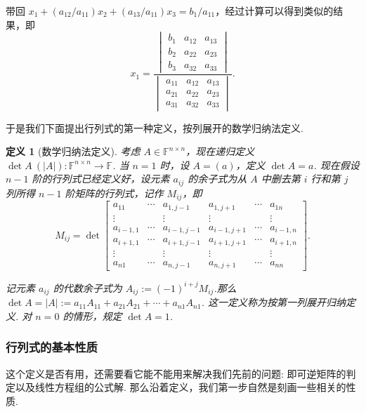 \documentclass[10pt,openany]{article}
\theoremstyle{thmstyle} %
\theoremstyle{defstyle} %
\newtheorem{definition}[theorem]{定义}
\theoremstyle{prostyle} %
\theoremstyle{exastyle}
\theoremstyle{remstyle}
\newcommand{\F}{\mathbb{F}}
\newcommand{\n}{^{n \times n}}
\begin{document}
带回 \( x_1+(a_{12}/a_{11})x_2+(a_{13}/a_{11}) x_3=b_1/a_{11} \)，经过计算可以得到类似的结果，即
\[ x_1=\frac{\begin{vmatrix}
		b_{1} & a_{12} & a_{13} \\
		b_{2} & a_{22} & a_{23} \\
		b_{3} & a_{32} & a_{33} 
\end{vmatrix}}{\begin{vmatrix}
		a_{11} & a_{12} & a_{13} \\
		a_{21} & a_{22} & a_{23} \\
		a_{31} & a_{32} & a_{33} 
\end{vmatrix}}. \]

于是我们下面提出行列式的第一种定义，按列展开的数学归纳法定义.

\begin{definition}[数学归纳法定义]\label{2.2.1}
	考虑 \( A \in \F\n \)，现在递归定义 \( \det A \ (|A|): \F\n \to \F \). 当 \( n=1 \) 时，设 \( A=(a) \)，定义 \( \det A=a \). 现在假设 \( n-1 \) 阶的行列式已经定义好，设元素 \( a_{ij} \) 的余子式为从 \( A \) 中删去第 \( i \) 行和第 \( j \) 列所得 \( n-1 \) 阶矩阵的行列式，记作 \( M_{ij} \)，即
	\[ M_{ij}=\det \begin{bmatrix}
		a_{11} & \cdots & a_{1,j-1} & a_{1,j+1} & \cdots & a_{1n} \\
		\vdots &        & \vdots   & \vdots   &        & \vdots \\
		a_{i-1,1} & \cdots & a_{i-1,j-1} & a_{i-1,j+1} & \cdots & a_{i-1,n} \\
		a_{i+1,1} & \cdots & a_{i+1,j-1} & a_{i+1,j+1} & \cdots & a_{i+1,n} \\
		\vdots &        & \vdots   & \vdots   &        & \vdots \\
		a_{n1} & \cdots & a_{n,j-1} & a_{n,j+1} & \cdots & a_{nn}
	\end{bmatrix}. \]
	
	记元素 \( a_{ij} \) 的代数余子式为 \( A_{ij}:=(-1)^{i+j}M_{ij} \).那么 \( \det A=|A|:= a_{11}A_{11}+a_{21}A_{21}+\cdots+a_{n1}A_{n1} \). 这一定义称为按第一列展开归纳定义. 对 \( n=0 \) 的情形，规定 \( \det A=1 \).
	
\end{definition}

\subsubsection{行列式的基本性质}

这个定义是否有用，还需要看它能不能用来解决我们先前的问题: 即可逆矩阵的判定以及线性方程组的公式解. 那么沿着定义，我们第一步自然是刻画一些相关的性质.
\end{document}
